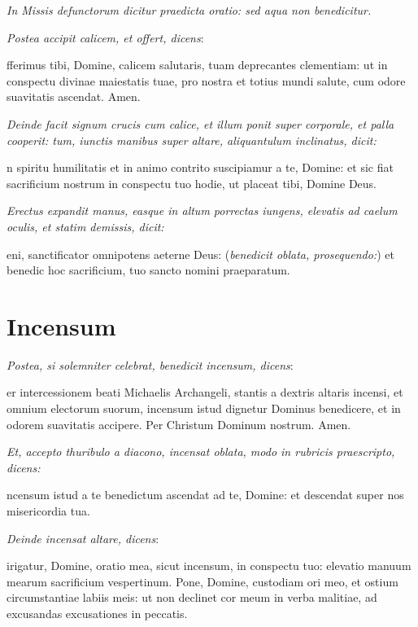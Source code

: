\divisio

\textit{%
    In Missis defunctorum dicitur praedicta oratio: sed aqua non
    benedicitur.
}

\divisio

\textit{Postea accipit calicem, et offert, dicens}:

fferimus tibi, Domine, calicem salutaris, tuam deprecantes
clementiam: ut in conspectu divinae maiestatis tuae, pro nostra et totius mundi
salute, cum odore suavitatis ascendat.  Amen.

\textit{%
    Deinde facit signum crucis cum calice, et illum ponit super corporale, et
    palla cooperit: tum, iunctis manibus super altare, aliquantulum inclinatus,
    dicit:
}


n spiritu humilitatis et in animo contrito suscipiamur a te,
Domine: et sic fiat sacrificium nostrum in conspectu tuo hodie, ut placeat tibi,
Domine Deus.

\textit{%
    Erectus expandit manus, easque in altum porrectas iungens, elevatis ad
    caelum oculis, et statim demissis, dicit:
}

eni, sanctificator omnipotens aeterne Deus: (\textit{benedicit
oblata, prosequendo:}) et bene\cross{}dic hoc sacrificium, tuo sancto nomini
praeparatum.

\section{Incensum}

\textit{Postea, si solemniter celebrat, benedicit incensum, dicens}:

er intercessionem beati Michaelis Archangeli, stantis a dextris
altaris incensi, et omnium electorum suorum, incensum istud dignetur Dominus
bene\cross{}dicere, et in odorem suavitatis accipere.  Per Christum Dominum
nostrum.  Amen.

\textit{%
    Et, accepto thuribulo a diacono, incensat oblata, modo in rubricis
    praescripto, dicens:
}

ncensum istud a te benedictum ascendat ad te, Domine: et descendat
super nos misericordia tua.

\textit{Deinde incensat altare, dicens}:


irigatur, Domine, oratio mea, sicut incensum, in conspectu tuo:
elevatio manuum mearum sacrificium vespertinum.  Pone, Domine, custodiam ori
meo, et ostium circumstantiae labiis meis: ut non declinet cor meum in verba
malitiae, ad excusandas excusationes in peccatis.

